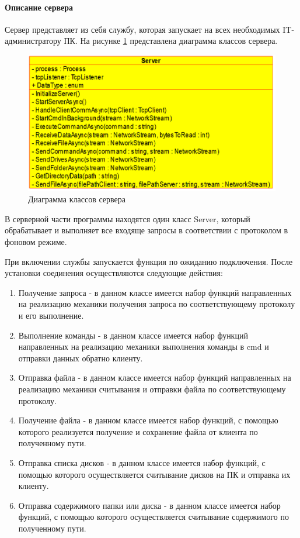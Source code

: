 \paragraph{Описание сервера}
Сервер представляет из себя службу, которая запускает на всех необходимых IT-администратору ПК. На рисунке \ref{fig:-class-diagrama-server} представлена диаграмма классов сервера.
\begin{figure}
	\centering
	\includegraphics[width=1\linewidth]{"images/Диаграмма сервера"}
	\caption{Диаграмма классов сервера}
	\label{fig:-class-diagrama-server}
\end{figure}

В серверной части программы находятся один класс Server, который обрабатывает и выполняет все входяще запросы в соответствии с протоколом в фоновом режиме. 

При включении службы запускается функция по ожиданию подключения. После установки соединения осуществляются следующие действия: 
\begin{enumerate}
	\item Получение запроса - в данном классе имеется набор функций направленных на реализацию механики получения запроса по соответствующему протоколу и его выполнение.
	\item Выполнение команды - в данном классе имеется набор функций направленных на реализацию механики выполнения команды в cmd и отправки данных обратно клиенту.
	\item Отправка файла - в данном классе имеется набор функций направленных на реализацию механики считывания и отправки файла по соответствующему протоколу.
	\item Получение файла - в данном классе имеется набор функций, с помощью которого реализуется получение и сохранение файла от клиента по полученному пути.
	\item Отправка списка дисков - в данном классе имеется набор функций, с помощью которого осуществляется считывание дисков на ПК и отправка их клиенту.
	\item Отправка содержимого папки или диска - в данном классе имеется набор функций, с помощью которого осуществляется считывание содержимого по полученному пути.
\end{enumerate}

